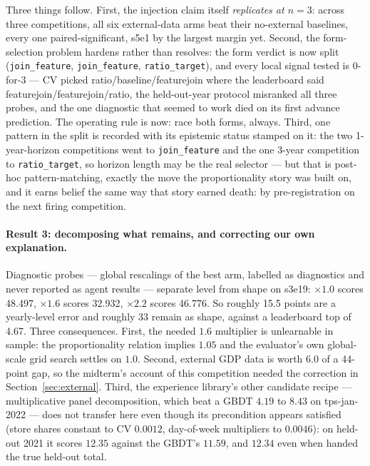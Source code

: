 \documentclass[11pt,a4paper]{article}
\begin{document}
Three things follow. First, the injection claim itself \emph{replicates at $n{=}3$}: across
three competitions, all six external-data arms beat their no-external baselines, every one
paired-significant, s5e1 by the largest margin yet. Second, the form-selection problem hardens
rather than resolves: the form verdict is now split (\texttt{join\_feature},
\texttt{join\_feature}, \texttt{ratio\_target}), and every local signal tested is 0-for-3 ---
CV picked ratio/baseline/featurejoin where the leaderboard said featurejoin/featurejoin/ratio,
the held-out-year protocol misranked all three probes, and the one diagnostic that seemed to
work died on its first advance prediction. The operating rule is now: race both forms, always.
Third, one pattern in the split is recorded with its epistemic status stamped on it: the two
1-year-horizon competitions went to \texttt{join\_feature} and the one 3-year competition to
\texttt{ratio\_target}, so horizon length may be the real selector --- but that is post-hoc
pattern-matching, exactly the move the proportionality story was built on, and it earns belief
the same way that story earned death: by pre-registration on the next firing competition.

\paragraph{Result 3: decomposing what remains, and correcting our own explanation.} Diagnostic probes --- global rescalings of the best arm, labelled as diagnostics and never reported as agent results --- separate level from shape on s3e19: $\times 1.0$ scores 48.497, $\times 1.6$ scores 32.932, $\times 2.2$ scores 46.776. So roughly 15.5 points are a yearly-level error and roughly 33 remain as shape, against a leaderboard top of 4.67. Three consequences. First, the needed $1.6$ multiplier is unlearnable in sample: the proportionality relation implies $1.05$ and the evaluator's own global-scale grid search settles on $1.0$. Second, external GDP data is worth $6.0$ of a 44-point gap, so the midterm's account of this competition needed the correction in Section~\ref{sec:external}. Third, the experience library's other candidate recipe --- multiplicative panel decomposition, which beat a GBDT $4.19$ to $8.43$ on tps-jan-2022 --- does not transfer here even though its precondition appears satisfied (store shares constant to CV $0.0012$, day-of-week multipliers to $0.0046$): on held-out 2021 it scores $12.35$ against the GBDT's $11.59$, and $12.34$ even when handed the true held-out total.
\end{document}
